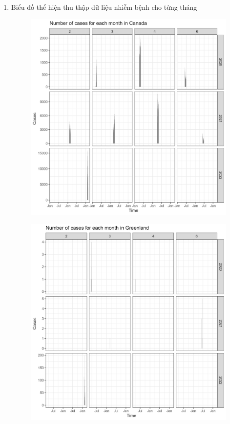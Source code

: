 \documentclass[a4paper]{article}
\theoremstyle{definition}
\begin{document}
\begin{enumerate}[i)]
		
		\begin{enumerate}[1)]
			\item Biểu đồ thể hiện thu thập dữ liệu nhiễm bệnh cho từng tháng
			\begin{figure}[H]
				\centering
				\includegraphics[scale=0.25]{images/6.1.1.png}
			\end{figure}
			\begin{figure}[H]
				\centering
				\includegraphics[scale=0.25]{images/6.1.2.png}

\end{figure}
\end{enumerate}
\end{enumerate}
\end{document}
